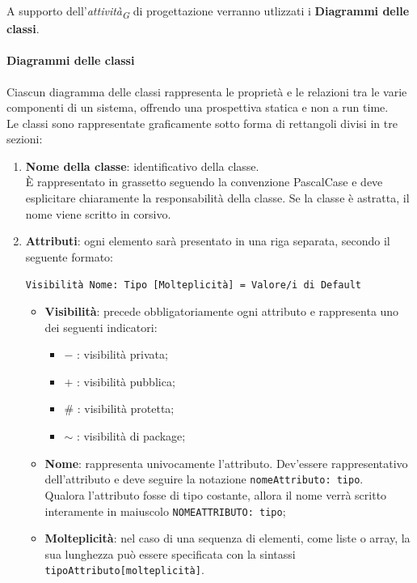 A supporto dell'\textit{attività}\textsubscript{\textit{G}} di progettazione verranno utlizzati i \textbf{Diagrammi delle classi}. \\

\paragraph*{Diagrammi delle classi}
Ciascun diagramma delle classi rappresenta le proprietà e le relazioni tra le varie componenti di un sistema, offrendo una prospettiva statica e non a run time. \\
Le classi sono rappresentate graficamente sotto forma di rettangoli divisi in tre sezioni:
\begin{enumerate}
    \item \textbf{Nome della classe}: identificativo della classe. \\
    È rappresentato in grassetto seguendo la convenzione PascalCase e deve esplicitare chiaramente la responsabilità della classe. Se la classe è astratta, il nome viene scritto in corsivo.
    \item \textbf{Attributi}: ogni elemento sarà presentato in una riga separata, secondo il seguente formato: \\
    \begin{center}\texttt{Visibilità Nome: Tipo [Molteplicità] = Valore/i di Default}\end{center}
    \begin{itemize}
        \item \textbf{Visibilità}: precede obbligatoriamente ogni attributo e rappresenta uno dei seguenti indicatori:
        \begin{itemize}
            \item $-$ : visibilità privata;
            \item $+$ : visibilità pubblica;
            \item $\#$ : visibilità protetta;
            \item $\sim$ : visibilità di package;
        \end{itemize}
        \item \textbf{Nome}: rappresenta univocamente l'attributo. Dev'essere rappresentativo dell'attributo e deve seguire la notazione \texttt{nomeAttributo: tipo}. \\
        Qualora l'attributo fosse di tipo costante, allora il nome verrà scritto interamente in maiuscolo \texttt{NOMEATTRIBUTO: tipo};
        \item \textbf{Molteplicità}: nel caso di una sequenza di elementi, come liste o array, la sua lunghezza può essere specificata con la sintassi \texttt{tipoAttributo[molteplicità]}. \\

\end{itemize}
\end{enumerate}
